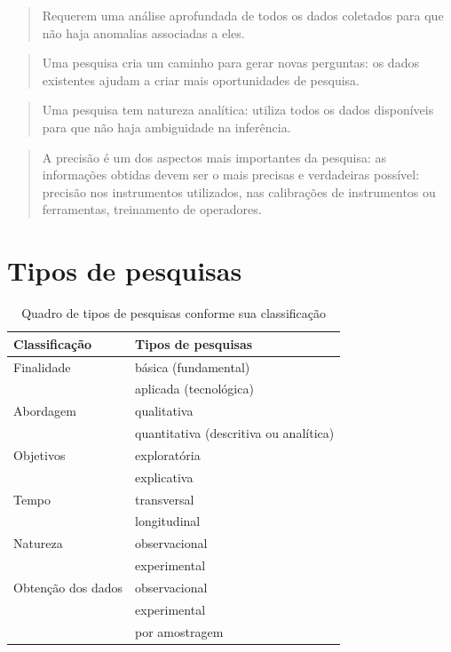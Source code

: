 \documentclass[
]{book}
\begin{document}
\hfill\break

\begin{quote}
Requerem uma análise aprofundada de todos os dados coletados para que não haja anomalias associadas a eles.
\end{quote}

\hfill\break

\begin{quote}
Uma pesquisa cria um caminho para gerar novas perguntas: os dados existentes ajudam a criar mais oportunidades de pesquisa.
\end{quote}

\hfill\break

\begin{quote}
Uma pesquisa tem natureza analítica: utiliza todos os dados disponíveis para que não haja ambiguidade na inferência.
\end{quote}

\hfill\break

\begin{quote}
A precisão é um dos aspectos mais importantes da pesquisa: as informações obtidas devem ser o mais precisas e verdadeiras possível: precisão nos instrumentos utilizados, nas calibrações de instrumentos ou ferramentas, treinamento de operadores.
\end{quote}

\hypertarget{tipos-de-pesquisas}{%
\section{Tipos de pesquisas}\label{tipos-de-pesquisas}}

\hfill\break

\begin{table}[h]
\centering
\caption{Quadro de tipos de pesquisas conforme sua classificação}
\begin{tabular}{|l|l|}
\hline 
\textbf{Classificação} & \textbf{Tipos de pesquisas}  \\ 
\hline 
Finalidade & básica (fundamental)   \\
           & aplicada (tecnológica) \\
\hline 
Abordagem  & qualitativa \\
           & quantitativa (descritiva ou analítica)\\
\hline 
Objetivos & exploratória \\
          & explicativa \\
\hline 
Tempo & transversal \\
      & longitudinal \\
\hline 
Natureza & observacional \\
         & experimental \\
\hline 
Obtenção dos dados & observacional \\
                    & experimental \\
                    & por amostragem \\

\hline 
\end{tabular} 
\end{table}
\end{document}

